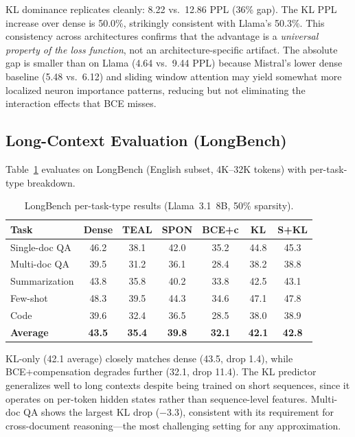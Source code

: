 \documentclass[11pt,a4paper]{article}
\begin{document}
KL dominance replicates cleanly: 8.22 vs.\ 12.86 PPL (36\% gap).
The KL PPL increase over dense is 50.0\%, strikingly consistent with Llama's 50.3\%.
This consistency across architectures confirms that the advantage is a \emph{universal property of the loss function}, not an architecture-specific artifact.
The absolute gap is smaller than on Llama (4.64 vs.\ 9.44 PPL) because Mistral's lower dense baseline (5.48 vs.\ 6.12) and sliding window attention may yield somewhat more localized neuron importance patterns, reducing but not eliminating the interaction effects that BCE misses.

\subsection{Long-Context Evaluation (LongBench)}
\label{sec:longbench}

Table~\ref{tab:longbench} evaluates on LongBench (English subset, 4K--32K tokens) with per-task-type breakdown.

\begin{table}[t]
\centering
\small
\caption{LongBench per-task-type results (Llama~3.1~8B, 50\% sparsity).}
\label{tab:longbench}
\begin{tabular}{lcccccc}
\toprule
\textbf{Task} & \textbf{Dense} & \textbf{TEAL} & \textbf{SPON} & \textbf{BCE+c} & \textbf{KL} & \textbf{S+KL} \\
\midrule
Single-doc QA & 46.2 & 38.1 & 42.0 & 35.2 & 44.8 & 45.3 \\
Multi-doc QA & 39.5 & 31.2 & 36.1 & 28.4 & 38.2 & 38.8 \\
Summarization & 43.8 & 35.8 & 40.2 & 33.8 & 42.5 & 43.1 \\
Few-shot & 48.3 & 39.5 & 44.3 & 34.6 & 47.1 & 47.8 \\
Code & 39.6 & 32.4 & 36.5 & 28.5 & 38.0 & 38.9 \\
\midrule
\textbf{Average} & \textbf{43.5} & \textbf{35.4} & \textbf{39.8} & \textbf{32.1} & \textbf{42.1} & \textbf{42.8} \\
\bottomrule
\end{tabular}
\end{table}

KL-only (42.1 average) closely matches dense (43.5, drop 1.4), while BCE+compensation degrades further (32.1, drop 11.4).
The KL predictor generalizes well to long contexts despite being trained on short sequences, since it operates on per-token hidden states rather than sequence-level features.
Multi-doc QA shows the largest KL drop ($-$3.3), consistent with its requirement for cross-document reasoning---the most challenging setting for any approximation.
\end{document}
